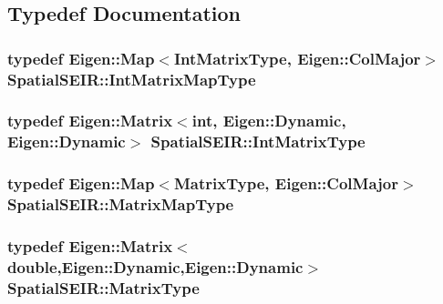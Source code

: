 \subsection{Typedef Documentation}
\hypertarget{namespaceSpatialSEIR_aef5eeacdd778eee57264f9ca171dd505}{
\subsubsection[{Int\-Matrix\-Map\-Type}]{\setlength{\rightskip}{0pt plus 5cm}typedef Eigen\-::\-Map$<${\bf Int\-Matrix\-Type}, Eigen\-::\-Col\-Major$>$ {\bf Spatial\-S\-E\-I\-R\-::\-Int\-Matrix\-Map\-Type}}}\label{namespaceSpatialSEIR_aef5eeacdd778eee57264f9ca171dd505}
\hypertarget{namespaceSpatialSEIR_a61e75b01f74b5a08c1528ac3bce40efd}{
\subsubsection[{Int\-Matrix\-Type}]{\setlength{\rightskip}{0pt plus 5cm}typedef Eigen\-::\-Matrix$<$int, Eigen\-::\-Dynamic, Eigen\-::\-Dynamic$>$ {\bf Spatial\-S\-E\-I\-R\-::\-Int\-Matrix\-Type}}}\label{namespaceSpatialSEIR_a61e75b01f74b5a08c1528ac3bce40efd}
\hypertarget{namespaceSpatialSEIR_a56ce20bdcae25d006d2ddc637596dbd3}{
\subsubsection[{Matrix\-Map\-Type}]{\setlength{\rightskip}{0pt plus 5cm}typedef Eigen\-::\-Map$<${\bf Matrix\-Type}, Eigen\-::\-Col\-Major$>$ {\bf Spatial\-S\-E\-I\-R\-::\-Matrix\-Map\-Type}}}\label{namespaceSpatialSEIR_a56ce20bdcae25d006d2ddc637596dbd3}
\hypertarget{namespaceSpatialSEIR_a998a0502213346d0f88197c232de3331}{
\subsubsection[{Matrix\-Type}]{\setlength{\rightskip}{0pt plus 5cm}typedef Eigen\-::\-Matrix$<$double,Eigen\-::\-Dynamic,Eigen\-::\-Dynamic$>$ {\bf Spatial\-S\-E\-I\-R\-::\-Matrix\-Type}}}\label{namespaceSpatialSEIR_a998a0502213346d0f88197c232de3331}


